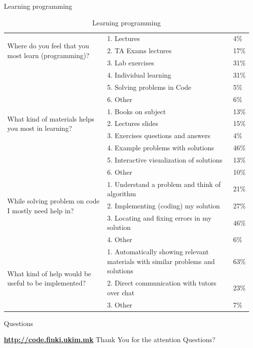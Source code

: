 \begin{frame}[shrink=20]{Learning programming}
\begin{table}[htb]
\caption{Learning programming}
\begin{center}
\begin{tabular}{ |p{4cm}|p{7cm}|l| }
\hline
\multirow{3}{4cm}{Where do you feel that you most learn (programming)?} &
1. Lectures & 4\%\\
\cline{2-3}
 & 2. TA Exams lectures & 17\% \\
 \cline{2-3}
 & 3. Lab exercises & 31\% \\
 \cline{2-3}
 & 4. Individual learning & 31\% \\
 \cline{2-3}
 & 5. Solving problems in Code & 5\% \\
 \cline{2-3}
 & 6. Other & 6\%\\
\hline
\multirow{3}{4cm}{What kind of materials helps you most in learning?} &
1. Books on subject & 13\%\\
\cline{2-3}
 & 2. Lectures slides & 15\% \\
\cline{2-3}
 & 3. Exercises questions and answers & 4\% \\
\cline{2-3} 
 & 4. Example problems with solutions & 46\% \\
 \cline{2-3}
 & 5. Interactive visualization of solutions & 13\% \\
 \cline{2-3}
 & 6. Other & 10\%\\
\hline
\multirow{3}{4cm}{While solving problem on code I mostly need help in?} &
1. Understand a problem and think of algorithm & 21\%\\
\cline{2-3}
 & 2. Implementing (coding) my solution & 27\% \\
 \cline{2-3}
 & 3. Locating and fixing errors in my solution & 46\% \\
 \cline{2-3}
 & 4. Other & 6\%\\
\hline
\multirow{3}{4cm}{What kind of help would be useful to be implemented?} &
1. Automatically showing relevant materials with similar problems and solutions
& 63\%\\
\cline{2-3}
 & 2. Direct communication with tutors over chat & 23\% \\
 \cline{2-3}
 & 3. Other & 7\%\\
\hline
\end{tabular}
\label{table:learning_programming}
\end{center}
\end{table}
\end{frame}


\begin{frame}{Questions}{}
    \begin{center}
    \Large{
    \href{http://code.finki.ukim.mk/}{\textbf{http://code.finki.ukim.mk}}}
    \vfill
    \huge{Thank You for the attention}
    \vfill    
    \Huge{Questions?}
    \end{center}
\end{frame}






